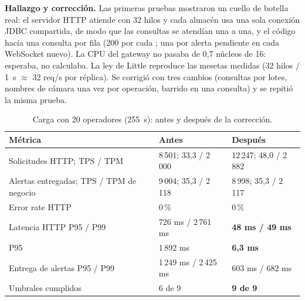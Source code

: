 \textbf{Hallazgo y corrección.} Las primeras pruebas mostraron un cuello de botella real: el servidor HTTP atiende con 32 hilos y cada almacén
usa una sola conexión JDBC compartida, de modo que las consultas se atendían una a una, y el código hacía una consulta por fila (200 por
cada ; una por alerta pendiente en cada WebSocket nuevo). La CPU del gateway no pasaba de 0,7 núcleos de 16: esperaba, no
calculaba. La ley de Little reproduce las mesetas medidas (32 hilos $/$ 1~s $\approx$ 32 req/s por réplica). Se corrigió con tres cambios
(consultas por lotes, nombres de cámara una vez por operación, barrido en una consulta) y se repitió la misma prueba.

\begin{table}[H]
\centering\small
\caption{Carga con 20 operadores (255~s): antes y después de la corrección.}\label{tab:carga}
\begin{tabularx}{\textwidth}{lYY}
\toprule
\textbf{Métrica} & \textbf{Antes} & \textbf{Después} \\
\midrule
Solicitudes HTTP; TPS / TPM & 8\,501; 33,3 / 2\,000 & 12\,247; 48,0 / 2\,882 \\
Alertas entregadas; TPS / TPM de negocio & 9\,004; 35,3 / 2\,118 & 8\,998; 35,3 / 2\,117 \\
Error rate HTTP & 0\,\% & 0\,\% \\
Latencia HTTP P95 / P99 & 726 ms / 2\,761 ms & \textbf{48 ms / 49 ms} \\
 P95 & 1\,892 ms & \textbf{6,3 ms} \\
Entrega de alertas P95 / P99 & 1\,249 ms / 2\,425 ms & 603 ms / 682 ms \\
Umbrales cumplidos & 6 de 9 & \textbf{9 de 9} \\
\bottomrule
\end{tabularx}
\end{table}

